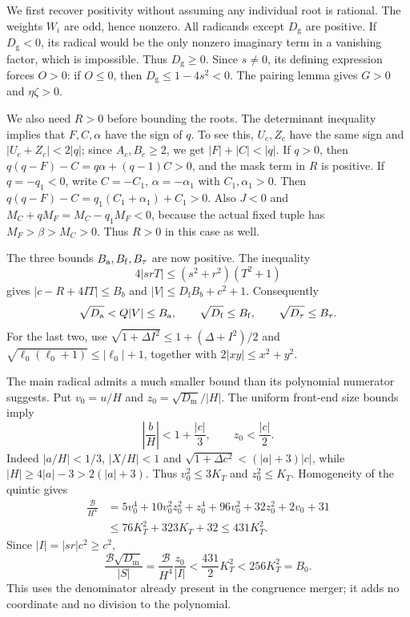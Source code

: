 \documentclass[11pt,a4paper]{article}
\theoremstyle{definition}\newtheorem{definition}[theorem]{Definition}
\theoremstyle{remark}\newtheorem{remark}[theorem]{Remark}
\newcommand{\Dm}{D_{\mathrm m}}\newcommand{\Df}{D_{\mathrm f}}
\newcommand{\Dt}{D_{\tau}}\newcommand{\Da}{D_{\mathrm a}}
\newcommand{\Dg}{D_{\mathrm g}}\newcommand{\Pair}{\operatorname{Pair}}
\numberwithin{equation}{section}
\begin{document}
We first recover positivity without assuming any individual root is
rational. The weights $W_i$ are odd, hence nonzero. All radicands
except $\Dg$ are positive. If $\Dg<0$, its radical would be the only
nonzero imaginary term in a vanishing factor, which is impossible.
Thus $\Dg\ge0$. Since $s\ne0$, its defining expression forces $O>0$:
if $O\le0$, then $\Dg\le1-4s^2<0$. The pairing lemma gives
$G>0$ and $\eta\zeta>0$.

We also need $R>0$ before bounding the roots. The determinant inequality
implies that $F,C,\alpha$ have the sign of $q$. To see this, $U_c,Z_c$
have the same sign and
$|U_c+Z_c|<2|q|$; since $A_c,B_c\ge2$, we get
$|F|+|C|<|q|$. If $q>0$, then
$q(q-F)-C=q\alpha+(q-1)C>0$, and the mask term in $R$ is positive.
If $q=-q_1<0$, write $C=-C_1$, $\alpha=-\alpha_1$ with
$C_1,\alpha_1>0$. Then
$q(q-F)-C=q_1(C_1+\alpha_1)+C_1>0$.
Also $J<0$ and $M_C+qM_F=M_C-q_1M_F<0$, because the actual
fixed tuple has $M_F>\beta>M_C>0$. Thus $R>0$ in this case as well.

The three bounds $B_{\rm a},B_{\rm f},B_\tau$ are now positive.
The inequality
\[
 4|srT|\le(s^2+r^2)(T^2+1)
\]
gives $|c-R+4IT|\le B_b$ and $|V|\le\Df B_b+c^2+1$.
Consequently
\begin{equation}
 \sqrt{\Da}<Q|V|\le B_{\rm a},\qquad
 \sqrt{\Df}\le B_{\rm f},\qquad
 \sqrt{\Dt}\le B_\tau.
 \label{eq:rootbounds12}
\end{equation}
For the last two, use
$\sqrt{1+\Delta I^2}\le1+(\Delta+I^2)/2$ and
$\sqrt{\ell_0(\ell_0+1)}\le|\ell_0|+1$, together with
$2|xy|\le x^2+y^2$.

The main radical admits a much smaller bound than its polynomial
numerator suggests. Put $v_0=u/H$ and $z_0=\sqrt{\Dm}/|H|$.
The uniform front-end size bounds imply
\[
 \left|\frac bH\right|<1+\frac{|c|}{3},\qquad
 z_0<\frac{|c|}{2}.
\]
Indeed $|a/H|<1/3$, $|X/H|<1$ and
$\sqrt{1+\Delta c^2}<(|a|+3)|c|$, while
$|H|\ge4|a|-3>2(|a|+3)$.
Thus $v_0^2\le3K_T$ and $z_0^2\le K_T$. Homogeneity of the quintic gives
\begin{align*}
 \frac{\mathcal B}{H^4}
 &=5v_0^4+10v_0^2z_0^2+z_0^4+96v_0^2+32z_0^2+2v_0+31\\
 &\le76K_T^2+323K_T+32\le431K_T^2.
\end{align*}
Since $|I|=|sr|c^2\ge c^2$,
\begin{equation}
 \frac{\mathcal B\sqrt{\Dm}}{|S|}
 =\frac{\mathcal B}{H^4}\frac{z_0}{|I|}
 <\frac{431}{2}K_T^2<256K_T^2=B_0.
 \label{eq:homogeneousbound}
\end{equation}
This uses the denominator already present in the congruence merger; it
adds no coordinate and no division to the polynomial.
\end{document}
